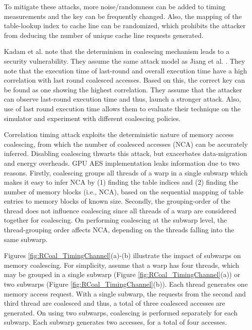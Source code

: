 To mitigate these attacks, more noise/randomness can be added to timing measurements and the key can be frequently changed. Also, the mapping of the table-lookup index to cache line can be randomized, which prohibits the attacker from deducing the number of unique cache line requests generated. 
 
 
Kadam et al. \cite{kadam2018rcoal} note that the determinism in coalescing mechanism leads to a security vulnerability. They assume the same attack model as Jiang et al. \cite{jiang2016complete}. They note that the execution time of last-round and overall execution time have a high correlation with last round coalesced accesses. Based on this, the correct key can be found as one showing the highest correlation. They assume that the attacker can observe last-round execution time and thus, launch a stronger attack. Also, use of last round execution time  allows them to evaluate their technique on the simulator and experiment with different coalescing policies. 


Correlation timing attack exploits the deterministic nature of memory access coalescing, from which the number of coalesced accesses (NCA) can be accurately inferred. Disabling coalescing thwarts this attack, but exacerbates data-migration and energy overheads. GPU AES implementation leaks information due to two reasons. Firstly, coalescing groups all threads of a warp in a single subwarp which makes it easy to infer NCA by (1) finding the table indices and (2) finding the number of memory blocks (i.e., NCA), based on the sequential mapping of table entries to memory blocks of known size.
Secondly, the grouping-order of the thread does not influence coalescing since all threads of a warp are considered together for coalescing. On performing coalescing at the subwarp level, the thread-grouping order affects NCA, depending on the threads falling into the same subwarp. 


Figures \ref{fig:RCoal_TimingChannel}(a)-(b) illustrate the impact of subwarps on memory coalescing. For simplicity, assume that a warp has four threads, which may be grouped in a single subwarp (Figure \ref{fig:RCoal_TimingChannel}(a)) or two subwarps (Figure \ref{fig:RCoal_TimingChannel}(b)). Each thread generates one memory access request. With a single subwarp, the requests from the second and third thread are coalesced and thus, a total of three coalesced accesses are generated. On using two subwarps, coalescing is performed separately for each subwarp. Each subwarp generates two accesses, for a total of four accesses.  

